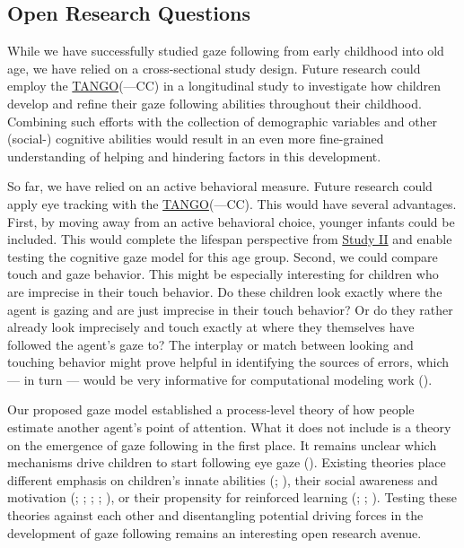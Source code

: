 \documentclass[
]{scrbook}
\begin{document}
\subsection{Open Research Questions}\label{open-research-questions}

While we have successfully studied gaze following from early childhood into old age, we have relied on a cross-sectional study design. Future research could employ the \hyperref[acronyms_TANGO]{TANGO}(---CC) in a longitudinal study to investigate how children develop and refine their gaze following abilities throughout their childhood. Combining such efforts with the collection of demographic variables and other (social-) cognitive abilities would result in an even more fine-grained understanding of helping and hindering factors in this development.

So far, we have relied on an active behavioral measure. Future research could apply eye tracking with the \hyperref[acronyms_TANGO]{TANGO}(---CC). This would have several advantages. First, by moving away from an active behavioral choice, younger infants could be included. This would complete the lifespan perspective from \hyperref[studyII]{Study II} and enable testing the cognitive gaze model for this age group. Second, we could compare touch and gaze behavior. This might be especially interesting for children who are imprecise in their touch behavior. Do these children look exactly where the agent is gazing and are just imprecise in their touch behavior? Or do they rather already look imprecisely and touch exactly at where they themselves have followed the agent's gaze to? The interplay or match between looking and touching behavior might prove helpful in identifying the sources of errors, which --- in turn --- would be very informative for computational modeling work ().

Our proposed gaze model established a process-level theory of how people estimate another agent's point of attention. What it does not include is a theory on the emergence of gaze following in the first place. It remains unclear which mechanisms drive children to start following eye gaze (). Existing theories place different emphasis on children's innate abilities (; ), their social awareness and motivation (; ; ; ; ), or their propensity for reinforced learning (; ; ). Testing these theories against each other and disentangling potential driving forces in the development of gaze following remains an interesting open research avenue.
\end{document}
